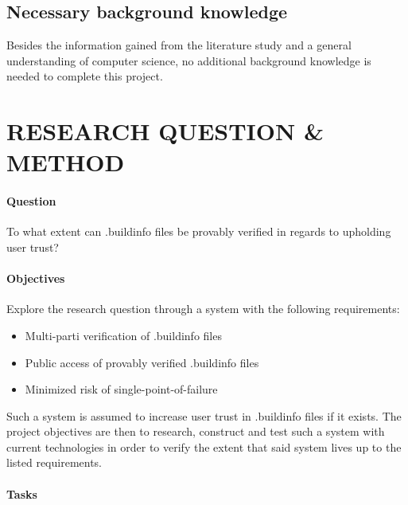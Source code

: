 \documentclass{article}
\begin{document}
\subsection*{Necessary background knowledge}

Besides the information gained from the literature study and a general understanding of computer science, no additional background knowledge is needed to complete this project. 

\section*{RESEARCH QUESTION \& METHOD}

\paragraph{Question} To what extent can .buildinfo files be provably verified in regards to upholding user trust?

\paragraph{Objectives} Explore the research question through a system with the following requirements:

\begin{itemize}
	\item Multi-parti verification of .buildinfo files
	\item Public access of provably verified .buildinfo files
	\item Minimized risk of single-point-of-failure
\end{itemize}

Such a system is assumed to increase user trust in .buildinfo files if it exists. The project objectives are then to research, construct and test such a system with current technologies in order to verify the extent that said system lives up to the listed requirements. 

\paragraph{Tasks} 
\end{document}
